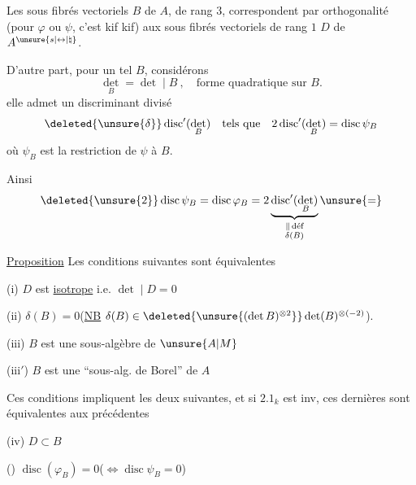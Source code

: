 Les sous fibrés vectoriels $B$ de $A$,  de rang $3$, correspondent par orthogonalité (pour $\varphi$ ou $\psi$, c'est kif kif) aux sous fibrés vectoriels de rang $1$ $D$ de $A^{\unsure{s|\leftrightarrow|\natural}}$.

D'autre part, pour un tel $B$, considérons
\[
\det_B=\det\mid B\ ,\quad\text{forme quadratique sur } B.
\]
elle admet un discriminant divisé
\[
\deleted{\unsure{\delta}}\operatorname{disc}'(\det_B)\quad\text{tels que}\quad2\operatorname{disc}'(\det_B)=\operatorname{disc}\psi_B
\]
où $\psi_B$ est la restriction de $\psi$ à $B$.

Ainsi
\[
\deleted{\unsure{2}}\operatorname{disc}\psi_B=\operatorname{disc}\varphi_B
=2\underbrace{\operatorname{disc}'(\det_B)}_{\substack{\parallel\,\text{déf}\\\delta(B)}}\unsure{=}
\]

\uline{Proposition} Les  conditions suivantes sont équivalentes

(i) $D$ est \uline{isotrope} i.e. $\det\mid D=0$

(ii) $\delta(B)=0$\qquad (\uline{NB} $\delta(B)\in\deleted{\unsure{(\det B)^{\otimes2}}}\det(B)^{\otimes(-2)}$).

 (iii) $B$ est une sous-algèbre de $\unsure{A|M}$


(iii$'$)  $B$ est une ``sous-alg. de Borel'' de $A$

Ces  conditions impliquent les deux suivantes, et si $2.1_k$ est inv,  ces dernières sont équivalentes aux précédentes

(iv) $D\subset B$

()  $\operatorname{disc}(\varphi_B)=0$\qquad ($\Longleftrightarrow\operatorname{disc}\psi_B=0$)
